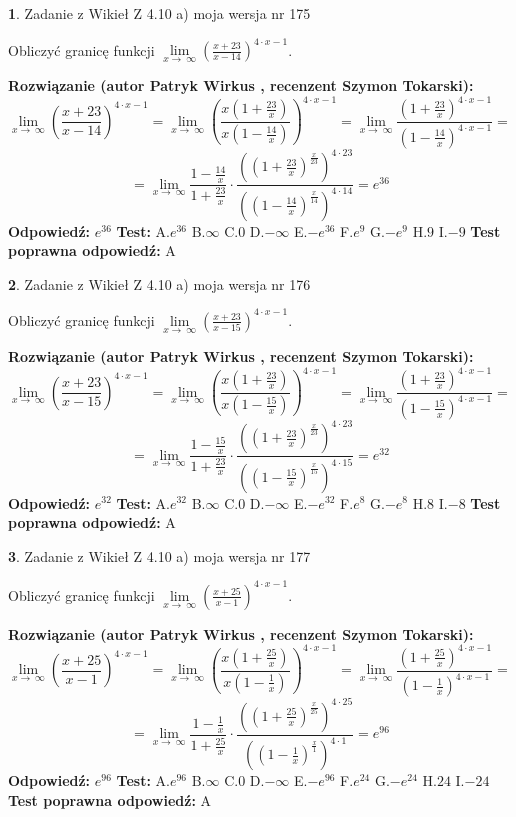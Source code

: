 \documentclass[12pt, a4paper]{article}
\theoremstyle{definition} %
\newtheorem{zad}{}
\newcommand{\zadStart}[1]{\begin{zad}#1\newline}
\newcommand{\zadStop}{\end{zad}}
\newcommand{\rozwStart}[2]{\noindent \textbf{Rozwiązanie (autor #1 , recenzent #2): }\newline}
\newcommand{\rozwStop}{\newline}
\newcommand{\odpStart}{\noindent \textbf{Odpowiedź:}\newline}
\newcommand{\odpStop}{\newline}
\newcommand{\testStart}{\noindent \textbf{Test:}\newline}
\newcommand{\testStop}{\newline}
\newcommand{\kluczStart}{\noindent \textbf{Test poprawna odpowiedź:}\newline}
\newcommand{\kluczStop}{\newline}
\begin{document}
\zadStart{Zadanie z Wikieł Z 4.10 a) moja wersja nr 175}

Obliczyć granicę funkcji  $\lim\limits_{x\to\ \infty}(\frac{x+23}{x-14})^{4\cdot x-1}$.
\zadStop
\rozwStart{Patryk Wirkus}{Szymon Tokarski}
$$\lim\limits_{x\to\ \infty}(\frac{x+23}{x-14})^{4\cdot x-1} = \lim\limits_{x\to\ \infty}(\frac{x(1+\frac{23}{x})}{x(1-\frac{14}{x})})^{4\cdot x-1}=\lim\limits_{x\to\ \infty}\frac{(1+\frac{23}{x})^{4\cdot x-1}}{(1-\frac{14}{x})^{4\cdot x-1}}=$$
$$=\lim\limits_{x\to\ \infty}\frac{1-\frac{14}{x}}{1+\frac{23}{x}}\cdot\frac{((1+\frac{23}{x})^{\frac{x}{23}})^{4\cdot23}}{((1-\frac{14}{x})^{\frac{x}{14}})^{4\cdot14}}=e^{36}$$
\rozwStop
\odpStart
$e^{36}$
\odpStop
\testStart
A.$e^{36}$ B.$\infty$ C.$0$ D.$-\infty$ E.$-e^{36}$
F.$e^{9}$ G.$-e^{9}$
H.$9$
I.$-9$
\testStop
\kluczStart
A
\kluczStop



\zadStart{Zadanie z Wikieł Z 4.10 a) moja wersja nr 176}

Obliczyć granicę funkcji  $\lim\limits_{x\to\ \infty}(\frac{x+23}{x-15})^{4\cdot x-1}$.
\zadStop
\rozwStart{Patryk Wirkus}{Szymon Tokarski}
$$\lim\limits_{x\to\ \infty}(\frac{x+23}{x-15})^{4\cdot x-1} = \lim\limits_{x\to\ \infty}(\frac{x(1+\frac{23}{x})}{x(1-\frac{15}{x})})^{4\cdot x-1}=\lim\limits_{x\to\ \infty}\frac{(1+\frac{23}{x})^{4\cdot x-1}}{(1-\frac{15}{x})^{4\cdot x-1}}=$$
$$=\lim\limits_{x\to\ \infty}\frac{1-\frac{15}{x}}{1+\frac{23}{x}}\cdot\frac{((1+\frac{23}{x})^{\frac{x}{23}})^{4\cdot23}}{((1-\frac{15}{x})^{\frac{x}{15}})^{4\cdot15}}=e^{32}$$
\rozwStop
\odpStart
$e^{32}$
\odpStop
\testStart
A.$e^{32}$ B.$\infty$ C.$0$ D.$-\infty$ E.$-e^{32}$
F.$e^{8}$ G.$-e^{8}$
H.$8$
I.$-8$
\testStop
\kluczStart
A
\kluczStop



\zadStart{Zadanie z Wikieł Z 4.10 a) moja wersja nr 177}

Obliczyć granicę funkcji  $\lim\limits_{x\to\ \infty}(\frac{x+25}{x-1})^{4\cdot x-1}$.
\zadStop
\rozwStart{Patryk Wirkus}{Szymon Tokarski}
$$\lim\limits_{x\to\ \infty}(\frac{x+25}{x-1})^{4\cdot x-1} = \lim\limits_{x\to\ \infty}(\frac{x(1+\frac{25}{x})}{x(1-\frac{1}{x})})^{4\cdot x-1}=\lim\limits_{x\to\ \infty}\frac{(1+\frac{25}{x})^{4\cdot x-1}}{(1-\frac{1}{x})^{4\cdot x-1}}=$$
$$=\lim\limits_{x\to\ \infty}\frac{1-\frac{1}{x}}{1+\frac{25}{x}}\cdot\frac{((1+\frac{25}{x})^{\frac{x}{25}})^{4\cdot25}}{((1-\frac{1}{x})^{\frac{x}{1}})^{4\cdot1}}=e^{96}$$
\rozwStop
\odpStart
$e^{96}$
\odpStop
\testStart
A.$e^{96}$ B.$\infty$ C.$0$ D.$-\infty$ E.$-e^{96}$
F.$e^{24}$ G.$-e^{24}$
H.$24$
I.$-24$
\testStop
\kluczStart
A
\kluczStop
\end{document}
